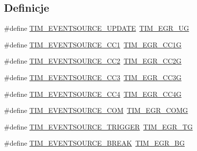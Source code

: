 \subsection*{Definicje}
\begin{DoxyCompactItemize}
\item 
\#define \hyperlink{group___t_i_m___event___source_ga6b9d1352735d2ddbafcaa31ae05cd1ee}{T\+I\+M\+\_\+\+E\+V\+E\+N\+T\+S\+O\+U\+R\+C\+E\+\_\+\+U\+P\+D\+A\+TE}~\hyperlink{group___peripheral___registers___bits___definition_ga16f52a8e9aad153223405b965566ae91}{T\+I\+M\+\_\+\+E\+G\+R\+\_\+\+UG}
\item 
\#define \hyperlink{group___t_i_m___event___source_ga529eadf26cd17108dd95b9707a3d0f55}{T\+I\+M\+\_\+\+E\+V\+E\+N\+T\+S\+O\+U\+R\+C\+E\+\_\+\+C\+C1}~\hyperlink{group___peripheral___registers___bits___definition_ga0a1318609761df5de5213e9e75b5aa6a}{T\+I\+M\+\_\+\+E\+G\+R\+\_\+\+C\+C1G}
\item 
\#define \hyperlink{group___t_i_m___event___source_ga12e3a98c601f4f288354ac2538050e6b}{T\+I\+M\+\_\+\+E\+V\+E\+N\+T\+S\+O\+U\+R\+C\+E\+\_\+\+C\+C2}~\hyperlink{group___peripheral___registers___bits___definition_ga5423de00e86aeb8a4657a509af485055}{T\+I\+M\+\_\+\+E\+G\+R\+\_\+\+C\+C2G}
\item 
\#define \hyperlink{group___t_i_m___event___source_ga1c2faf942ab525b44299ddd0a6d848e4}{T\+I\+M\+\_\+\+E\+V\+E\+N\+T\+S\+O\+U\+R\+C\+E\+\_\+\+C\+C3}~\hyperlink{group___peripheral___registers___bits___definition_ga064d2030abccc099ded418fd81d6aa07}{T\+I\+M\+\_\+\+E\+G\+R\+\_\+\+C\+C3G}
\item 
\#define \hyperlink{group___t_i_m___event___source_ga157e43c99e6a1c0097b184cc842b5dfb}{T\+I\+M\+\_\+\+E\+V\+E\+N\+T\+S\+O\+U\+R\+C\+E\+\_\+\+C\+C4}~\hyperlink{group___peripheral___registers___bits___definition_ga1c4e5555dd3be8ab1e631d1053f4a305}{T\+I\+M\+\_\+\+E\+G\+R\+\_\+\+C\+C4G}
\item 
\#define \hyperlink{group___t_i_m___event___source_ga5724ce4aaf842a2166edaaff1531c1d1}{T\+I\+M\+\_\+\+E\+V\+E\+N\+T\+S\+O\+U\+R\+C\+E\+\_\+\+C\+OM}~\hyperlink{group___peripheral___registers___bits___definition_gadb06f8bb364307695c7d6a028391de7b}{T\+I\+M\+\_\+\+E\+G\+R\+\_\+\+C\+O\+MG}
\item 
\#define \hyperlink{group___t_i_m___event___source_ga85573ed76442490db67e4b759fe6d901}{T\+I\+M\+\_\+\+E\+V\+E\+N\+T\+S\+O\+U\+R\+C\+E\+\_\+\+T\+R\+I\+G\+G\+ER}~\hyperlink{group___peripheral___registers___bits___definition_ga2eabface433d6adaa2dee3df49852585}{T\+I\+M\+\_\+\+E\+G\+R\+\_\+\+TG}
\item 
\#define \hyperlink{group___t_i_m___event___source_ga83d16368fe3172a98c41d7c414780a64}{T\+I\+M\+\_\+\+E\+V\+E\+N\+T\+S\+O\+U\+R\+C\+E\+\_\+\+B\+R\+E\+AK}~\hyperlink{group___peripheral___registers___bits___definition_ga08c5635a0ac0ce5618485319a4fa0f18}{T\+I\+M\+\_\+\+E\+G\+R\+\_\+\+BG}
\end{DoxyCompactItemize}


